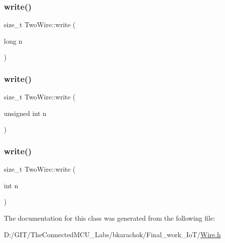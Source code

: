 \mbox{\label{class_two_wire_a55a9894186458e43852f6fb7c59bb066}} 
\subsubsection{\texorpdfstring{write()}{write()}\hspace{0.1cm}{\footnotesize\ttfamily [4/6]}}
{\footnotesize\ttfamily size\+\_\+t Two\+Wire\+::write (\begin{DoxyParamCaption}\item[{long}]{n }\end{DoxyParamCaption})\hspace{0.3cm}{\ttfamily [inline]}}

\mbox{\label{class_two_wire_afdb917746ee37f72e7452b4782e9527b}} 
\subsubsection{\texorpdfstring{write()}{write()}\hspace{0.1cm}{\footnotesize\ttfamily [5/6]}}
{\footnotesize\ttfamily size\+\_\+t Two\+Wire\+::write (\begin{DoxyParamCaption}\item[{unsigned int}]{n }\end{DoxyParamCaption})\hspace{0.3cm}{\ttfamily [inline]}}

\mbox{\label{class_two_wire_a8ec34b0d2a75e8b2751eb9f4332bd7c3}} 
\subsubsection{\texorpdfstring{write()}{write()}\hspace{0.1cm}{\footnotesize\ttfamily [6/6]}}
{\footnotesize\ttfamily size\+\_\+t Two\+Wire\+::write (\begin{DoxyParamCaption}\item[{int}]{n }\end{DoxyParamCaption})\hspace{0.3cm}{\ttfamily [inline]}}



The documentation for this class was generated from the following file\+:\begin{DoxyCompactItemize}
\item 
D\+:/\+G\+I\+T/\+The\+Connected\+M\+C\+U\+\_\+\+Labs/bkarachok/\+Final\+\_\+work\+\_\+\+Io\+T/\hyperlink{_wire_8h}{Wire.\+h}\end{DoxyCompactItemize}
